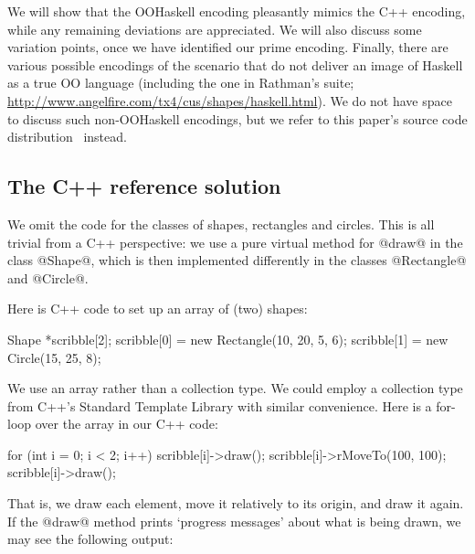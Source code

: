 We will show that the OOHaskell encoding pleasantly mimics the C++
encoding, while any remaining deviations are appreciated. We will also
discuss some variation points, once we have identified our prime
encoding. Finally, there are various possible encodings of the
scenario that do not deliver an image of Haskell as a true OO language
(including the one in Rathman's suite;
\url{http://www.angelfire.com/tx4/cus/shapes/haskell.html}). We do not
have space to discuss such non-OOHaskell encodings, but we refer to
this paper's source code distribution~\cite{OOHaskell} instead.






\subsection{The C++ reference solution}

We omit the code for the classes of shapes, rectangles and
circles. This is all trivial from a C++ perspective: we use a
pure virtual method for @draw@ in the class @Shape@, which is then
implemented differently in the classes @Rectangle@ and @Circle@.

Here is C++ code to set up an array of (two) shapes:

\begin{code}
   Shape *scribble[2];
   scribble[0] = new Rectangle(10, 20, 5, 6);
   scribble[1] = new Circle(15, 25, 8);
\end{code}

\noindent
We use an array rather than a collection type. We could employ a
collection type from C++'s Standard Template Library with similar
convenience. Here is a for-loop over the array in our C++ code:

\begin{code}
   for (int i = 0; i < 2; i++) {
      scribble[i]->draw();
      scribble[i]->rMoveTo(100, 100);
      scribble[i]->draw();
   }
\end{code}

\noindent
That is, we draw each element, move it relatively to its
origin, and draw it again. If the @draw@ method prints
`progress messages' about what is being drawn, we may see the
following output:

